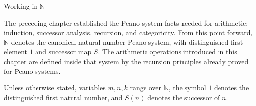 \label{sec:canonical-natural-number-system}

\begin{topicbox}{Working in \texorpdfstring{$\mathbb{N}$}{N}}
\begin{exposition}
The preceding chapter established the Peano-system facts needed for arithmetic:
induction, successor analysis, recursion, and categoricity. From this point
forward, $\mathbb{N}$ denotes the canonical natural-number Peano system, with
distinguished first element $1$ and successor map $S$. The arithmetic
operations introduced in this chapter are defined inside that system by the
recursion principles already proved for Peano systems.
\end{exposition}

\begin{remark*}
Unless otherwise stated, variables $m,n,k$ range over $\mathbb{N}$, the symbol
$1$ denotes the distinguished first natural number, and $S(n)$ denotes the
successor of $n$.
\end{remark*}
\end{topicbox}
